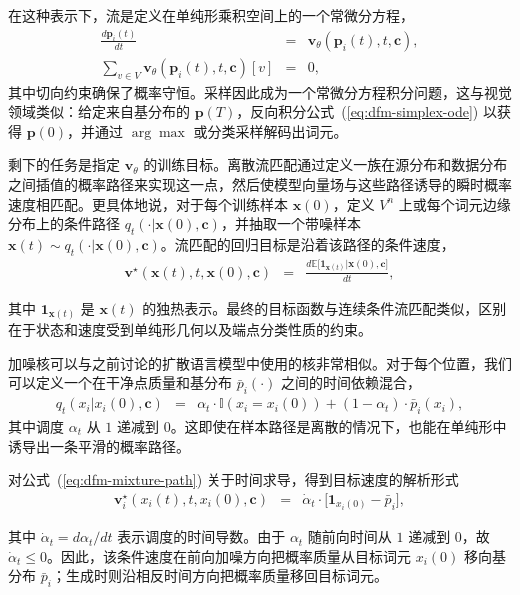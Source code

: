 \documentclass[UTF8,a4paper,zihao=-4,oneside,openany]{ctexbook}
\begin{document}
在这种表示下，流是定义在单纯形乘积空间上的一个常微分方程，
\begin{eqnarray}
\frac{d\mathbf{p}_i(t)}{dt} & = & \mathbf{v}_{\theta}(\mathbf{p}_i(t),t,\mathbf{c}), \\
\sum_{v\in V}\mathbf{v}_{\theta}(\mathbf{p}_i(t),t,\mathbf{c})[v] & = & 0,
\label{eq:dfm-simplex-ode}
\end{eqnarray}
其中切向约束确保了概率守恒。采样因此成为一个常微分方程积分问题，这与视觉领域类似：给定来自基分布的 $\mathbf{p}(T)$，反向积分公式~(\ref{eq:dfm-simplex-ode}) 以获得 $\mathbf{p}(0)$，并通过 $\arg\max$ 或分类采样解码出词元。

剩下的任务是指定 $\mathbf{v}_\theta$ 的训练目标。离散流匹配通过定义一族在源分布和数据分布之间插值的概率路径来实现这一点，然后使模型向量场与这些路径诱导的瞬时概率速度相匹配。更具体地说，对于每个训练样本 $\mathbf{x}(0)$，定义 $V^n$ 上或每个词元边缘分布上的条件路径 $q_t(\cdot | \mathbf{x}(0), \mathbf{c})$，并抽取一个带噪样本 $\mathbf{x}(t)\sim q_t(\cdot | \mathbf{x}(0), \mathbf{c})$。流匹配的回归目标是沿着该路径的条件速度，
\begin{eqnarray}
\mathbf{v}^\star(\mathbf{x}(t),t,\mathbf{x}(0),\mathbf{c})
& = &
\frac{d \mathbb{E}\big[\mathbf{1}_{\mathbf{x}(t)} | \mathbf{x}(0), \mathbf{c} \big]}{dt},
\label{eq:dfm-target-velocity}
\end{eqnarray}

\noindent 其中 $\mathbf{1}_{\mathbf{x}(t)}$ 是 $\mathbf{x}(t)$ 的独热表示。最终的目标函数与连续条件流匹配类似，区别在于状态和速度受到单纯形几何以及端点分类性质的约束。

加噪核可以与之前讨论的扩散语言模型中使用的核非常相似。对于每个位置，我们可以定义一个在干净点质量和基分布 $\bar{p}_i(\cdot)$ 之间的时间依赖混合，
\begin{eqnarray}
q_t(x_i | x_i(0), \mathbf{c})
& = &
\alpha_t \cdot \mathbb{I}(x_i = x_i(0))
+
(1-\alpha_t) \cdot \bar{p}_i(x_i),
\label{eq:dfm-mixture-path}
\end{eqnarray}
其中调度 $\alpha_t$ 从 $1$ 递减到 $0$。这即使在样本路径是离散的情况下，也能在单纯形中诱导出一条平滑的概率路径。

对公式~(\ref{eq:dfm-mixture-path}) 关于时间求导，得到目标速度的解析形式
\begin{eqnarray}
\mathbf{v}^\star_i(x_i(t), t, x_i(0), \mathbf{c})
& = &
\dot{\alpha}_t \cdot \big[ \mathbf{1}_{x_i(0)} - \bar{p}_i \big],
\label{eq:dfm-analytic-velocity}
\end{eqnarray}

\noindent 其中 $\dot{\alpha}_t = d\alpha_t/dt$ 表示调度的时间导数。由于 $\alpha_t$ 随前向时间从 $1$ 递减到 $0$，故 $\dot{\alpha}_t\leq 0$。因此，该条件速度在前向加噪方向把概率质量从目标词元 $x_i(0)$ 移向基分布 $\bar{p}_i$；生成时则沿相反时间方向把概率质量移回目标词元。
\end{document}
